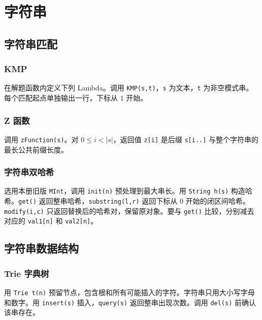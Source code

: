 \chapter{字符串}

\section{字符串匹配}

\subsection{KMP}

在解题函数内定义下列 Lambda。调用 \texttt{KMP(s,t)}，\texttt{s} 为文本，\texttt{t} 为非空模式串。每个匹配起点单独输出一行，下标从 $1$ 开始。


\subsection{Z 函数}

调用 \texttt{zFunction(s)}。对 $0\le i<|s|$，返回值 \texttt{z[i]} 是后缀 \texttt{s[i..]} 与整个字符串的最长公共前缀长度。


\subsection{字符串双哈希}

选用本册旧版 \texttt{MInt}，调用 \texttt{init(n)} 预处理到最大串长。用 \texttt{String h(s)} 构造哈希。\texttt{get()} 返回整串哈希，\texttt{substring(l,r)} 返回下标从 $0$ 开始的闭区间哈希。\texttt{modify(i,c)} 只返回替换后的哈希对，保留原对象。要与 \texttt{get()} 比较，分别减去对应的 \texttt{val1[n]} 和 \texttt{val2[n]}。


\section{字符串数据结构}

\subsection{Trie 字典树}

用 \texttt{Trie t(n)} 预留节点，包含根和所有可能插入的字符。字符串只用大小写字母和数字。用 \texttt{insert(s)} 插入，\texttt{query(s)} 返回整串出现次数。调用 \texttt{del(s)} 前确认该串存在。

